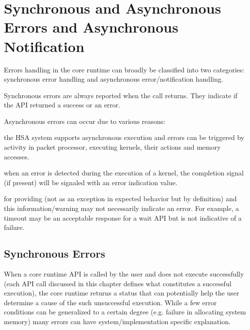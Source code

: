 \begin{DIFnomarkup}
\hypertarget{error}{}\section{Synchronous and Asynchronous Errors and
Asynchronous Notification}
\label{error}
\end{DIFnomarkup}

Errors handling in the core runtime can broadly be classified into
two categories: synchronous error handling and asynchronous
error/notification handling. 

Synchronous errors are always reported when the call returns. They
indicate if the API returned a success or an error.

Asynchronous errors can occur due to various reasons:
\begin{inparaenum}[(i)] \item the HSA system supports asynchronous
execution and errors can be triggered by activity in packet
processor, executing kernels, their actions and memory accesses.
\item when an error is detected during the execution of a kernel,
the completion signal (if present) will be signaled with an error
indication value.  \item for providing 
(not as an exception in expected behavior but by definition) and
this information/warning may not necessarily indicate an error. For
example, a timeout may be an acceptable response for a wait API but
is not indicative of a failure. \end{inparaenum}

\begin{DIFnomarkup}
\hypertarget{syncerror}{}\subsection{Synchronous Errors }\label{syncerror}
\end{DIFnomarkup}

When a core runtime API is called by the user and does not execute
successfully (each API call discussed in this chapter defines what
constitutes a successful execution), the core runtime returns a
status that can potentially help the user determine a cause of the
such unsuccessful execution.  While a few error conditions can be
generalized to a certain degree (e.g. failure in allocating system
memory) many errors can have system/implementation specific
explanation. 

